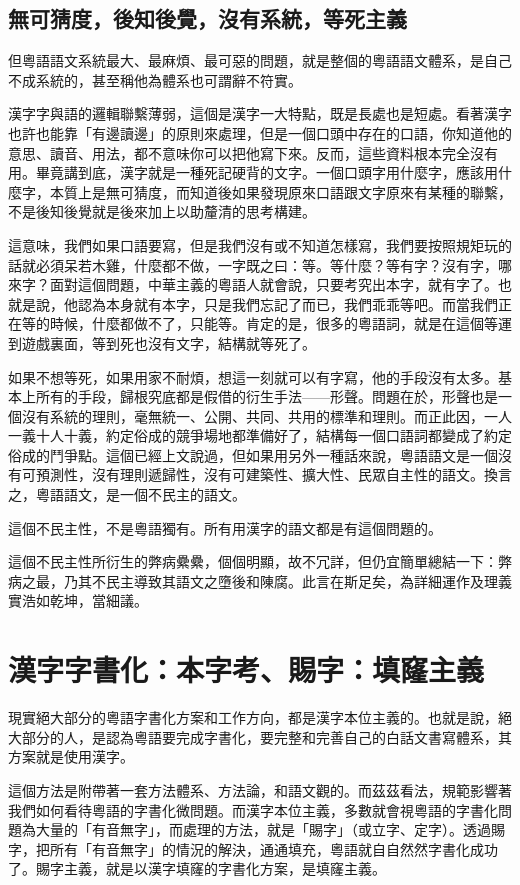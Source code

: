 \documentclass[a5paper, 12pt, openany]{book} %
\begin{document}
\section{無可猜度，後知後覺，沒有系統，等死主義}

但粵語語文系統最大、最麻煩、最可惡的問題，就是整個的粵語語文體系，是自己不成系統的，甚至稱他為體系也可謂辭不符實。 

漢字字與語的邏輯聯繫薄弱，這個是漢字一大特點，既是長處也是短處。看著漢字也許也能靠「有邊讀邊」的原則來處理，但是一個口頭中存在的口語，你知道他的意思、讀音、用法，都不意味你可以把他寫下來。反而，這些資料根本完全沒有用。畢竟講到底，漢字就是一種死記硬背的文字。一個口頭字用什麼字，應該用什麼字，本質上是無可猜度，而知道後如果發現原來口語跟文字原來有某種的聯繫，不是後知後覺就是後來加上以助釐清的思考構建。

這意味，我們如果口語要寫，但是我們沒有或不知道怎樣寫，我們要按照規矩玩的話就必須呆若木雞，什麼都不做，一字既之曰：等。等什麼？等有字？沒有字，哪來字？面對這個問題，中華主義的粵語人就會說，只要考究出本字，就有字了。也就是說，他認為本身就有本字，只是我們忘記了而已，我們乖乖等吧。而當我們正在等的時候，什麼都做不了，只能等。肯定的是，很多的粵語詞，就是在這個等運到遊戲裏面，等到死也沒有文字，結構就等死了。

如果不想等死，如果用家不耐煩，想這一刻就可以有字寫，他的手段沒有太多。基本上所有的手段，歸根究底都是假借的衍生手法——形聲。問題在於，形聲也是一個沒有系統的理則，毫無統一、公開、共同、共用的標準和理則。而正此因，一人一義十人十義，約定俗成的競爭場地都準備好了，結構每一個口語詞都變成了約定俗成的鬥爭點。這個已經上文說過，但如果用另外一種話來說，粵語語文是一個沒有可預測性，沒有理則遞歸性，沒有可建築性、擴大性、民眾自主性的語文。換言之，粵語語文，是一個不民主的語文。

這個不民主性，不是粵語獨有。所有用漢字的語文都是有這個問題的。

這個不民主性所衍生的弊病纍纍，個個明顯，故不冗詳，但仍宜簡單總結一下：弊病之最，乃其不民主導致其語文之墮後和陳腐。此言在斯足矣，為詳細運作及理義實浩如乾坤，當細議。

\chapter{漢字字書化：本字考、賜字：填窿主義}

現實絕大部分的粵語字書化方案和工作方向，都是漢字本位主義的。也就是說，絕大部分的人，是認為粵語要完成字書化，要完整和完善自己的白話文書寫體系，其方案就是使用漢字。

這個方法是附帶著一套方法體系、方法論，和語文觀的。而茲茲看法，規範影響著我們如何看待粵語的字書化微問題。而漢字本位主義，多數就會視粵語的字書化問題為大量的「有音無字」，而處理的方法，就是「賜字」（或立字、定字）。透過賜字，把所有「有音無字」的情況的解決，通通填充，粵語就自自然然字書化成功了。賜字主義，就是以漢字填窿的字書化方案，是填窿主義。
\end{document}
